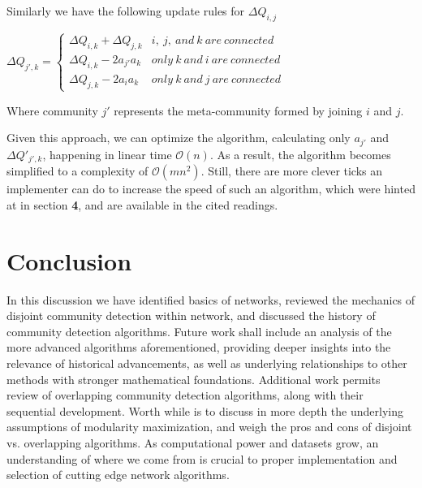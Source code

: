 \documentclass[a4paper, 10pt, twocolumn]{article}
\newcommand{\ds}{\displaystyle}
\begin{document}
\noindent
Similarly we have the following update rules for $ \Delta Q_{i, j} $

\vspace{2.5mm}
$
\ds \Delta Q_{j', k} = 
\begin{cases} \ds
       \Delta Q_{i, k} + \Delta Q_{j, k} & i, \ j, \ and \ k \ are \ connected \\ 
       \Delta Q_{i, k} - 2a_{j'}a_{k} & only \ k \ and \ i \ are \ connected \\
       \Delta Q_{j, k} - 2a_{i}a_{k} & only \ k \ and \ j \ are \ connected
\end{cases}
$
\vspace{2.5mm}

\noindent
Where community $ j' $ represents the meta-community formed by joining $ i $ and $ j $. 

Given this approach, we can optimize the algorithm, calculating only $ a_{j'} $ and $ \Delta Q'_{j', k} $, happening in linear time $ \mathcal{O}(n) $.
As a result, the algorithm becomes simplified to a complexity of $ \mathcal{O}(mn^{2}) $.
Still, there are more clever ticks an implementer can do to increase the speed of such an algorithm, which were hinted at in section \textbf{4}, and are available in the cited readings. 

\section{Conclusion}

In this discussion we have identified basics of networks, reviewed the mechanics of disjoint community detection within network, and discussed the history of community detection algorithms. 
Future work shall include an analysis of the more advanced algorithms aforementioned, providing deeper insights into the relevance of historical advancements, as well as underlying relationships to other methods with stronger mathematical foundations. 
Additional work permits review of overlapping community detection algorithms, along with their sequential development. 
Worth while is to discuss in more depth the underlying assumptions of modularity maximization, and weigh the pros and cons of disjoint vs. overlapping algorithms. 
As computational power and datasets grow, an understanding of where we come from is crucial to proper implementation and selection of cutting edge network algorithms.



{}
\end{document}
